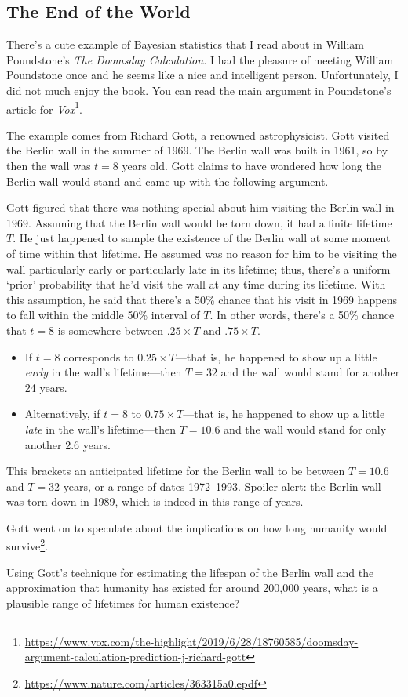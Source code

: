 \subsection{The End of the World}

There's a cute example of Bayesian statistics that I read about in William Poundstone's \emph{The Doomsday Calculation.} I had the pleasure of meeting William Poundstone once and he seems like a nice and intelligent person. Unfortunately, I did not much enjoy the book. You can read the main argument in Poundstone's article for \emph{Vox}\footnote{\url{https://www.vox.com/the-highlight/2019/6/28/18760585/doomsday-argument-calculation-prediction-j-richard-gott}}.

The example comes from Richard Gott, a renowned astrophysicist. Gott visited the Berlin wall in the summer of 1969. The Berlin wall was built in 1961, so by then the wall was $t=8$ years old. Gott claims to have wondered how long the Berlin wall would stand and came up with the following argument.

Gott figured that there was nothing special about him visiting the Berlin wall in 1969. Assuming that the Berlin wall would be torn down, it had a finite lifetime $T$. He just happened to sample the existence of the Berlin wall at some moment of time within that lifetime. He assumed was no reason for him to be visiting the wall particularly early or particularly late in its lifetime; thus, there's a uniform `prior' probability that he'd visit the wall at any time during its lifetime. With this assumption, he said that there's a 50\% chance that his visit in 1969 happens to fall within the middle 50\% interval of $T$. In other words, there's a 50\% chance that $t=8$ is somewhere between $.25\times T$ and $.75\times T$. 
\begin{itemize}
\item If $t=8$ corresponds to $0.25 \times T$---that is, he happened to show up a little \emph{early} in the wall's lifetime---then $T=32$ and the wall would stand for another 24 years. 

\item Alternatively, if $t=8$ to $0.75 \times T$---that is, he happened to show up a little \emph{late} in the wall's lifetime---then $T=10.6$ and the wall would stand for only another 2.6 years. 
\end{itemize}
This brackets an anticipated lifetime for the Berlin wall to be between $T=10.6$ and $T=32$ years, or a range of dates 1972--1993. Spoiler alert: the Berlin wall was torn down in 1989, which is indeed in this range of years. 

Gott went on to speculate about the implications on how long humanity would survive\footnote{\url{https://www.nature.com/articles/363315a0.epdf}}.
\begin{exercise}
Using Gott's technique for estimating the lifespan of the Berlin wall and the approximation that humanity has existed for around 200,000 years, what is a plausible range of lifetimes for human existence?
\end{exercise}

